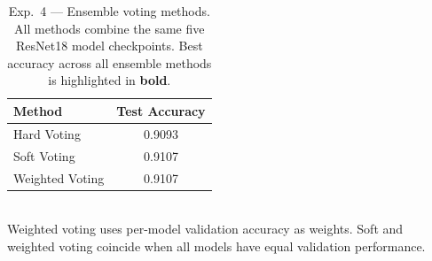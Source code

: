 \begin{table}[H]
\centering
\caption{Exp.\ 4 --- Ensemble voting methods. All methods combine the same five ResNet18 model checkpoints. Best accuracy across all ensemble methods is highlighted in \textbf{bold}.}
\label{tab:exp4_voting}
\small
\begin{tabular}{lc}
\toprule
\textbf{Method} & \textbf{Test Accuracy} \\
\midrule
Hard Voting & 0.9093 \\
Soft Voting & 0.9107 \\
Weighted Voting & 0.9107 \\
\bottomrule
\end{tabular}
\\[4pt]\footnotesize Weighted voting uses per-model validation accuracy as weights. Soft and weighted voting coincide when all models have equal validation performance.
\end{table}
